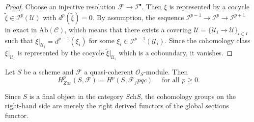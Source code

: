 \begin{proof}
Choose an injective resolution $\mathcal{F} \to \mathcal{I}^\bullet$. Then $\xi$ is represented by a cocycle $\tilde{\xi} \in \mathcal{I}^p(\mathcal{U})$ with $d^p(\tilde{\xi}) = 0$. By assumption, the sequence $\mathcal{I}^{p-1} \to \mathcal{I}^{p} \to \mathcal{I}^{p+1}$ in exact in $\text{Ab}(\mathcal{C})$, which means that there exists a covering $\mathcal{U} = \{ \mathcal{U}_i \to \mathcal{U} \}_{i \in I}$ such that $\tilde{\xi}|_{\mathcal{U}_i} = d^{p-1}(\xi_i)$ for some $\xi_i \in \mathcal{I}^{p-1}(\mathcal{U}_i)$. Since the cohomology class $\xi|_{\mathcal{U}_i}$ is represented by the cocycle $\tilde{\xi}|_{\mathcal{U}_i}$ which is a coboundary, it vanishes.
\end{proof}

\begin{theorem} \label{thm:ZarIsFpqcForQCoh}
Let $S$ be a scheme and $\mathcal{F}$ a quasi-coherent $\mathcal{O}_S$-module. Then 
$$
H_{Zar}^p(S, \mathcal{F}) = H^p(S, \mathcal{F}_fpqc) \quad \text{ for all } p\geq 0.
$$
\end{theorem}

\begin{remark}
Since $S$ is a final object in the category $\textit{Sch}S$, the cohomology groups on the right-hand side are merely the right derived functors of the global sections functor.
\end{remark}

